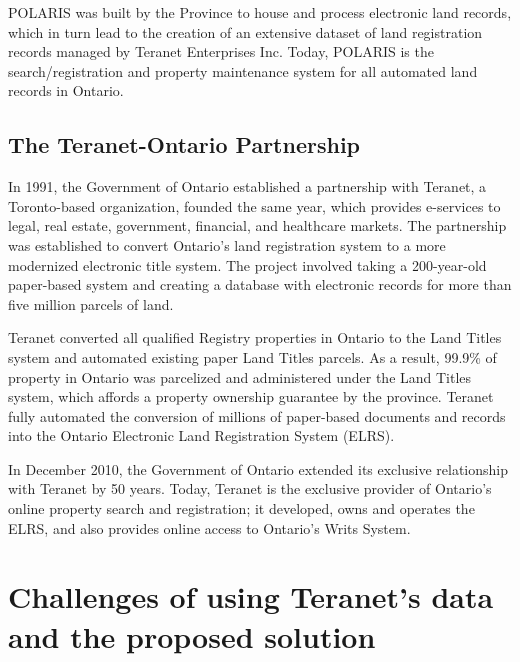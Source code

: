 POLARIS was built by the Province to house and process electronic land records, which in turn lead to the creation of an extensive dataset of land registration records managed by Teranet Enterprises Inc.
Today, POLARIS is the search/registration and property maintenance system for all automated land records in Ontario.

\subsection{The Teranet-Ontario Partnership} \label{subsec:teranet_ontario}

In 1991, the Government of Ontario established a partnership with Teranet\cite{TeranetEnterprisesInc.2019}, a Toronto-based organization, founded the same year, which provides e-services to legal, real estate, government, financial, and healthcare markets.
The partnership was established to convert Ontario's land registration system to a more modernized electronic title system.
The project involved taking a 200-year-old paper-based system and creating a database with electronic records for more than five million parcels of land.

Teranet converted all qualified Registry properties in Ontario to the Land Titles system and automated existing paper Land Titles parcels.
As a result, 99.9\% of property in Ontario was parcelized and administered under the Land Titles system, which affords a property ownership guarantee by the province.
Teranet fully automated the conversion of millions of paper-based documents and records into the Ontario Electronic Land Registration System (ELRS).

In December 2010, the Government of Ontario extended its exclusive relationship with Teranet by 50 years.
Today, Teranet is the exclusive provider of Ontario's online property search and registration;
it developed, owns and operates the ELRS, and also provides online access to Ontario's Writs System.

\section{Challenges of using Teranet's data and the proposed solution} \label{sec:challenges}

